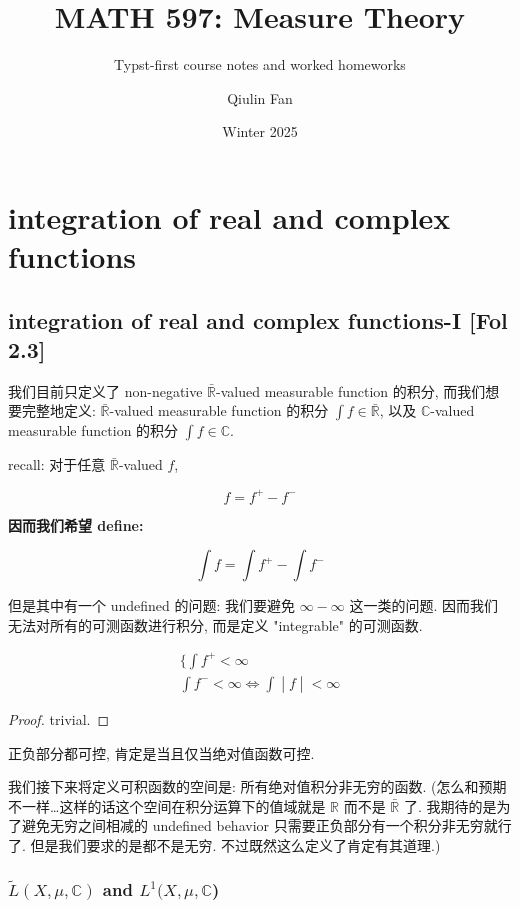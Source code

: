 \documentclass{qlnotes-export}
\title{MATH 597: Measure Theory}
\subtitle{Typst-first course notes and worked homeworks}
\author{Qiulin Fan}
\date{Winter 2025}
\begin{document}
\mainmatter
\chapter{integration of real and complex functions}\label{integration-of-real-and-complex-functions}

\section{integration of real and complex functions-I {[}Fol 2.3{]}}

我们目前只定义了 non-negative \(\bar{\mathbb{R}}\)-valued measurable function 的积分, 而我们想要完整地定义: \(\bar{\mathbb{R}}\)-valued measurable function 的积分 \(\int f \in \bar{\mathbb{R}}\), 以及 \(\mathbb{C}\)-valued measurable function 的积分 \(\int f \in {\mathbb{C}}\).

recall: 对于任意 \(\bar{\mathbb{R}}\)-valued \(f\),

\[f = f^{+} - f^{-}\]

\textbf{因而我们希望 define:}

\[\int f = \int f^{+} - \int f^{-}\]

但是其中有一个 undefined 的问题: 我们要避免 \(\infty - \infty\) 这一类的问题. 因而我们无法对所有的可测函数进行积分, 而是定义 "integrable" 的可测函数.

\begin{lemma}

\[\begin{matrix}
{\{\int f^{+} < \infty} \\
\left. \int f^{-} < \infty\Leftrightarrow\int \middle| f \middle| < \infty \right.
\end{matrix}\]

\end{lemma}

\begin{proof}

trivial.

\end{proof}

正负部分都可控, 肯定是当且仅当绝对值函数可控.

我们接下来将定义可积函数的空间是: 所有绝对值积分非无穷的函数. (怎么和预期不一样\ldots 这样的话这个空间在积分运算下的值域就是 \(\mathbb{R}\) 而不是 \(\bar{\mathbb{R}}\) 了. 我期待的是为了避免无穷之间相减的 undefined behavior 只需要正负部分有一个积分非无穷就行了. 但是我们要求的是都不是无穷. 不过既然这么定义了肯定有其道理.)

\subsection{\texorpdfstring{\(\widetilde{L}(X,\mu,{\mathbb{C}})\) and \(L^{1}(X,\mu,{\mathbb{C}}\))}{\textbackslash widetilde\{L\}(X,\textbackslash mu,\{\textbackslash mathbb\{C\}\}) and L\^{}\{1\}(X,\textbackslash mu,\{\textbackslash mathbb\{C\}\})}}\label{widetildelxmumathbbc-and-l1xmumathbbc}
\end{document}
